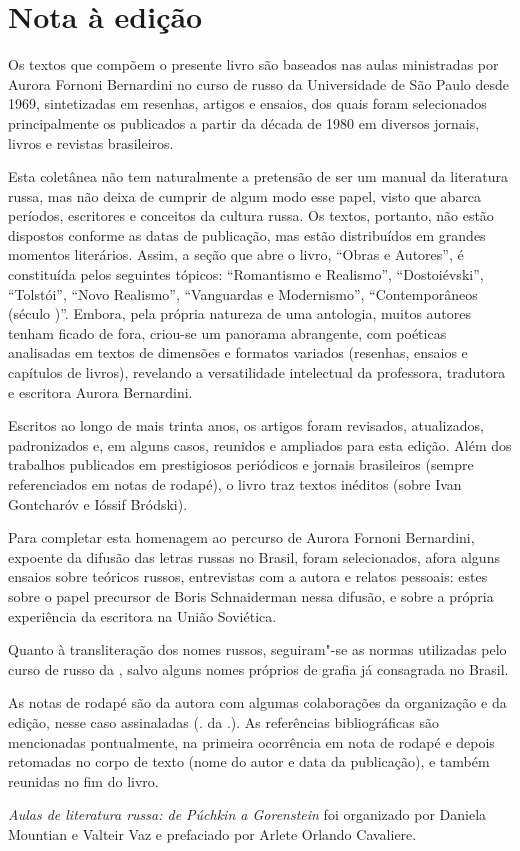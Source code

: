 \chapter{Nota à edição}

Os textos que compõem o presente livro são baseados nas aulas
ministradas por Aurora Fornoni Bernardini no curso de russo da
Universidade de São Paulo desde 1969, sintetizadas em resenhas, artigos
e ensaios, dos quais foram selecionados principalmente os publicados a partir da década
de 1980 em diversos jornais, livros e revistas brasileiros.

Esta coletânea não tem naturalmente a pretensão de ser um manual
da literatura russa, mas não deixa de cumprir de algum modo
esse papel, visto que abarca períodos, escritores e conceitos da
cultura russa. Os textos, portanto, não estão dispostos conforme as
datas de publicação, mas estão distribuídos em grandes momentos
literários. Assim, a seção que abre o livro, ``Obras e Autores'', é
constituída pelos seguintes tópicos: ``Romantismo e Realismo'',
``Dostoiévski'', ``Tolstói'', ``Novo Realismo'', ``Vanguardas e
Modernismo'', ``Contemporâneos (século \scalebox{0.8}{XX})''. Embora, pela própria
natureza de uma antologia, muitos autores tenham ficado de fora,
criou-se um panorama abrangente, com poéticas analisadas em textos de
dimensões e formatos variados (resenhas, ensaios e capítulos de livros),
revelando a versatilidade intelectual da professora, tradutora e
escritora Aurora Bernardini.

Escritos ao longo de mais trinta anos, os artigos foram revisados,
atualizados, padronizados e, em alguns casos, reunidos e ampliados para
esta edição. Além dos trabalhos publicados em prestigiosos periódicos e
jornais brasileiros (sempre referenciados em notas de rodapé), o livro
traz textos inéditos (sobre Ivan Gontcharóv e Ióssif Bródski).

Para completar esta homenagem ao percurso de Aurora Fornoni Bernardini,
expoente da difusão das letras russas no Brasil, foram selecionados,
afora alguns ensaios sobre teóricos russos, entrevistas com a autora e
relatos pessoais: estes sobre o papel precursor de Boris Schnaiderman nessa
difusão, e sobre a própria experiência da escritora na União Soviética.

Quanto à transliteração dos nomes russos, seguiram"-se as normas
utilizadas pelo curso de russo da \scalebox{0.8}{USP}, salvo alguns nomes próprios de
grafia já consagrada no Brasil.

As notas de rodapé são da autora com algumas colaborações da organização
e da edição, nesse caso assinaladas (\scalebox{0.8}{N}. da \scalebox{0.8}{E}.). As referências
bibliográficas são mencionadas pontualmente, na primeira ocorrência em
nota de rodapé e depois retomadas no corpo de texto (nome do autor e
data da publicação), e também reunidas no fim do livro.

\emph{Aulas de literatura russa: de Púchkin a Gorenstein} foi
organizado por Daniela Mountian e Valteir Vaz e prefaciado por Arlete
Orlando Cavaliere.
